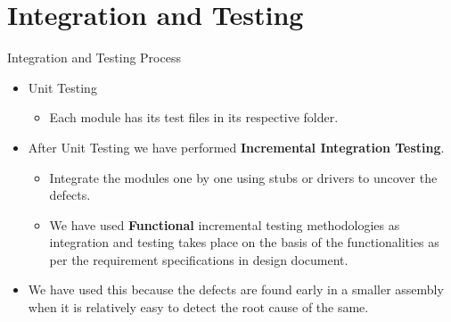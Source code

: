 \documentclass{beamer}
\begin{document}
\section{Integration and Testing}
\begin{frame}{Integration and Testing Process}
    \begin{itemize}
        \item Unit Testing
            \begin{itemize}
                \item Each module has its test files in its respective folder. 
            \end{itemize}
        \item After Unit Testing we have performed \textbf{Incremental Integration Testing}.
            \begin{itemize}
                \item Integrate the modules one by one using stubs or drivers to uncover the defects.
                \item We have used \textbf{Functional} incremental testing methodologies as integration and testing takes place on the basis of the functionalities as per the requirement specifications in design document.
            \end{itemize}
        \item We have used this because the defects are found early in a smaller assembly when it is relatively easy to detect the root cause of the same.
    \end{itemize}
\end{frame}


% 
% 

\end{document}
